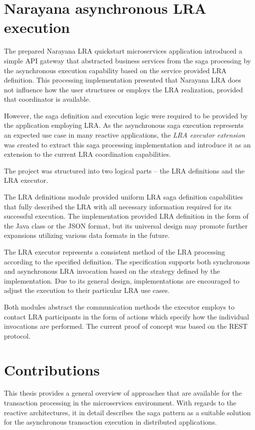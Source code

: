 \documentclass[oneside,
  digital, %
  table,   %
  lof,     %
  lot,     %
]{fithesis3}
\begin{document}
\section{Narayana asynchronous LRA execution}

The prepared Narayana LRA quickstart microservices application introduced a simple API gateway that abstracted business services from the saga processing by the asynchronous execution capability based on the service provided LRA definition. This processing implementation presented that Narayana LRA does not influence how the user structures or employs the LRA realization, provided that coordinator is available.

However, the saga definition and execution logic were required to be provided by the application employing LRA. As the asynchronous saga execution represents an expected use case in many reactive applications, the \textit{LRA executor extension} was created to extract this saga processing implementation and introduce it as an extension to the current LRA coordination capabilities.

The project was structured into two logical parts -- the LRA definitions and the LRA executor.

The LRA definitions module provided uniform LRA saga definition capabilities that fully described the LRA with all necessary information required for its successful execution. The implementation provided LRA definition in the form of the Java class or the JSON format, but its universal design may promote further expansions utilizing various data formats in the future. 

The LRA executor represents a consistent method of the LRA processing according to the specified definition. The specification supports both synchronous and asynchronous LRA invocation based on the strategy defined by the implementation. Due to its general design, implementations are encouraged to adjust the execution to their particular LRA use cases.

Both modules abstract the communication methods the executor employs to contact LRA participants in the form of actions which specify how the individual invocations are performed. The current proof of concept was based on the REST protocol.

\section{Contributions}

This thesis provides a general overview of approaches that are available for the transaction processing in the microservices environment. With regards to the reactive architectures, it in detail describes the saga pattern as a suitable solution for the asynchronous transaction execution in distributed applications.
\end{document}
